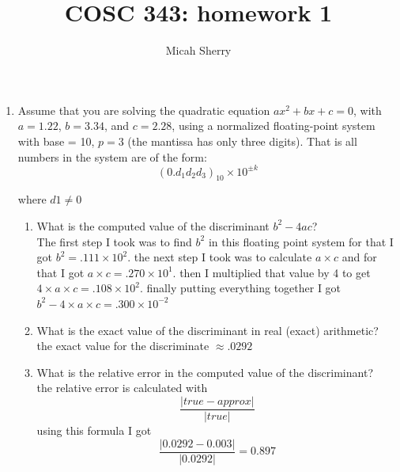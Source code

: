 \documentclass{article}
\title{COSC 343: homework 1}
\author{Micah Sherry}
\begin{document}
\maketitle

\begin{enumerate}

\item Assume that you are solving the quadratic equation $ ax^2 + bx + c = 0 $, 
with $ a = 1.22 $, $ b = 3.34 $, 
and $ c = 2.28 $, using a normalized floating-point system with base = 10, $ p = 3 $ 
(the mantissa has only three digits). That is all numbers in the system are of the form:
$$ (0.d_1d_2d_3)_{10} \times 10^{\pm k}$$


where $d1 \neq 0$ 
    \begin{enumerate}
        \item What is the computed value of the discriminant $ b^2- 4ac$? 
        \\ The first step I took was to find $b^2$ in this floating point system for that I got $b^2 = .111 \times 10^2$. the next step I took was to calculate $ a \times c$ and for that I got $ a \times c = .270 \times 10^1$. then I multiplied that value by 4 to get $ 4\times a \times c = .108 \times 10^2 $. finally putting everything together I got $b^2 - 4\times a \times c = .300\times 10^{-2}$
        \item What is the exact value of the discriminant in real (exact) arithmetic?
        \\ the exact value for the discriminate $ \approx .0292 $
        \item What is the relative error in the computed value of the discriminant?
        \\ the relative error is calculated with $$ \frac{|true - approx|}{|true|}$$ using this formula I got $$\frac{|0.0292 - 0.003|}{|0.0292|}= 0.897$$
    \end{enumerate}


\end{enumerate}
\end{document}
